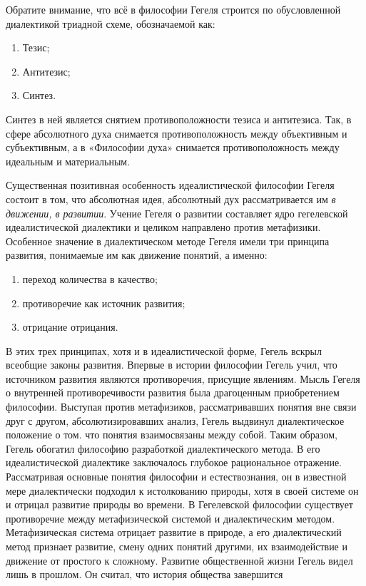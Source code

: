 \documentclass[12pt]{article}
\begin{document}
Обратите внимание, что всё в философии Гегеля строится по обусловленной диалектикой триадной схеме, обозначаемой как:
\begin{enumerate}
	\item Тезис;
	\item Антитезис;
	\item Синтез.
\end{enumerate}
Синтез в ней является снятием противоположности тезиса и антитезиса.
Так, в сфере абсолютного духа снимается противоположность между объективным и субъективным,
а в «Философии духа» снимается противоположность между идеальным и материальным.

Существенная позитивная особенность идеалистической философии Гегеля состоит в том, что абсолютная идея, абсолютный
дух  рассматривается им \textit{в движении,  в  развитии}.
Учение  Гегеля  о  развитии  составляет  ядро  гегелевской
идеалистической диалектики и целиком направлено против 
метафизики. Особенное значение в диалектическом методе  Гегеля  имели  три  принципа  развития,  понимаемые  им  как  движение  понятий,  а  именно:
\begin{enumerate}
	\item переход количества в качество;
	\item противоречие как источник развития;
	\item отрицание отрицания.
\end{enumerate}
В этих трех принципах, хотя и в идеалистической форме, Гегель вскрыл всеобщие законы развития.
Впервые в истории философии Гегель учил, что источником развития являются противоречия, присущие явлениям.
Мысль Гегеля о внутренней противоречивости развития была драгоценным приобретением философии.
Выступая  против  метафизиков,  рассматривавших  понятия  вне  связи  друг  с  другом,  абсолютизировавших 
анализ, Гегель выдвинул диалектическое положение о том. что понятия взаимосвязаны между собой. Таким
образом, Гегель обогатил философию разработкой диалектического метода. В его идеалистической диалектике
заключалось глубокое рациональное отражение. Рассматривая основные понятия философии и естествознания,
он в известной мере диалектически подходил к истолкованию природы, хотя в своей системе он и отрицал
развитие природы во времени.
В  Гегелевской  философии  существует  противоречие  между  метафизической  системой  и  диалектическим
методом. Метафизическая система отрицает развитие в природе, а его диалектический метод признает развитие,
смену одних понятий другими, их взаимодействие и движение от простого к сложному.
Развитие общественной жизни Гегель видел лишь в прошлом. Он считал, что история общества завершится
\end{document}
